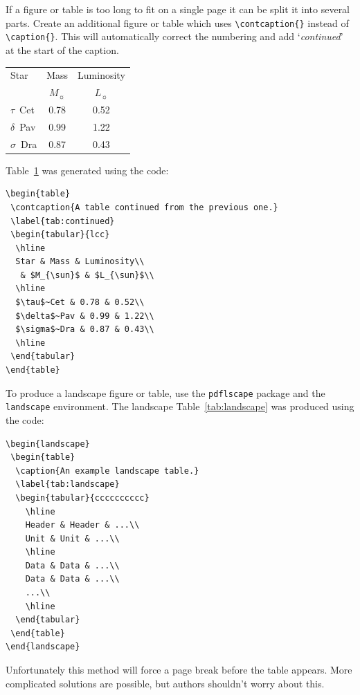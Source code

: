 \documentclass[a4paper,fleqn,usenatbib,useAMS]{mnras}
\begin{document}
If a figure or table is too long to fit on a single page it can be split it into several parts.
Create an additional figure or table which uses \verb'\contcaption{}' instead of \verb'\caption{}'.
This will automatically correct the numbering and add `\emph{continued}' at the start of the caption.
\begin{table}
 \label{tab:continued}
 \begin{tabular}{lcc}
  \hline
  Star & Mass & Luminosity\\
   & $M_{\sun}$ & $L_{\sun}$\\
  \hline
  $\tau$~Cet & 0.78 & 0.52\\
  $\delta$~Pav & 0.99 & 1.22\\
  $\sigma$~Dra & 0.87 & 0.43\\
  \hline
 \end{tabular}
\end{table}
Table~\ref{tab:continued} was generated using the code:

\begin{verbatim}
\begin{table}
 \contcaption{A table continued from the previous one.}
 \label{tab:continued}
 \begin{tabular}{lcc}
  \hline
  Star & Mass & Luminosity\\
   & $M_{\sun}$ & $L_{\sun}$\\
  \hline
  $\tau$~Cet & 0.78 & 0.52\\
  $\delta$~Pav & 0.99 & 1.22\\
  $\sigma$~Dra & 0.87 & 0.43\\
  \hline
 \end{tabular}
\end{table}
\end{verbatim}

To produce a landscape figure or table, use the \verb'pdflscape' package and the \verb'landscape' environment.
The landscape Table~\ref{tab:landscape} was produced using the code:
\begin{verbatim}
\begin{landscape}
 \begin{table}
  \caption{An example landscape table.}
  \label{tab:landscape}
  \begin{tabular}{cccccccccc}
    \hline
    Header & Header & ...\\
    Unit & Unit & ...\\
    \hline
    Data & Data & ...\\
    Data & Data & ...\\
    ...\\
    \hline
  \end{tabular}
 \end{table}
\end{landscape}
\end{verbatim}
Unfortunately this method will force a page break before the table appears.
More complicated solutions are possible, but authors shouldn't worry about this.
\end{document}
